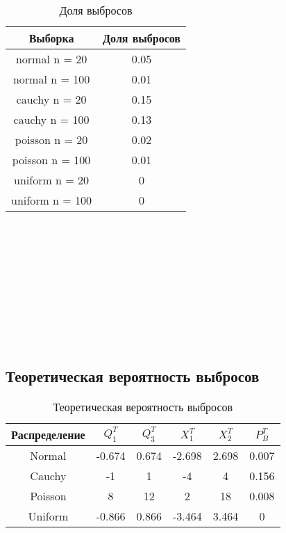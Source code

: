 \documentclass{article}
\begin{document}
\begin{table}[h!]
\begin{center}
\begin{tabular}{|c|c|}
\hline
Выборка & Доля выбросов \\
\hline
normal n = 20 & 0.05 \\
\hline
normal n = 100 & 0.01 \\
\hline
cauchy n = 20 & 0.15 \\
\hline
cauchy n = 100 & 0.13 \\
\hline
poisson n = 20 & 0.02 \\
\hline
poisson n = 100 & 0.01 \\
\hline
uniform n = 20 & 0 \\
\hline
uniform n = 100 & 0 \\
\hline


\end{tabular}
\caption{Доля выбросов}
\label{tabular:timesandtenses}
\end{center}
\end{table}

~\\
~\\
~\\
~\\
~\\
~\\
~\\
~\\
~\\

\subsection{Теоретическая вероятность выбросов}

\begin{table}[h!]
\begin{center}
\begin{tabular}{|c|c|c|c|c|c|}
\hline
Распределение & $Q^T_1$ & $Q^T_3$ & $X^T_1$ & $X^T_2$ & $P^T_B$ \\
\hline
Normal & -0.674 & 0.674 & -2.698 & 2.698 & 0.007\\
\hline
Cauchy & -1 & 1 & -4 & 4 & 0.156 \\
\hline
Poisson & 8 & 12 & 2 & 18 & 0.008\\
\hline
Uniform & -0.866 & 0.866 & -3.464 & 3.464 & 0 \\
\hline
\end{tabular}
\caption{Теоретическая вероятность выбросов}
\label{tabular:timesandtenses}
\end{center}
\end{table}
\end{document}
